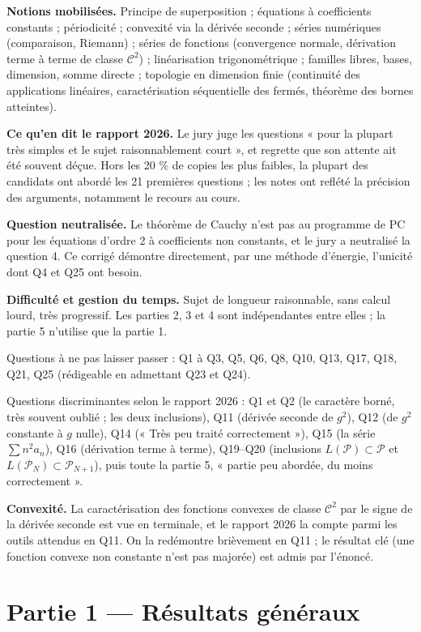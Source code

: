 \documentclass[11pt,a4paper]{article}
\begin{document}
\textbf{Notions mobilisées.} Principe de superposition ; équations à coefficients constants ; périodicité ; convexité via la dérivée seconde ; séries numériques (comparaison, Riemann) ; séries de fonctions (convergence normale, dérivation terme à terme de classe \(\mathcal C^2\)) ; linéarisation trigonométrique ; familles libres, bases, dimension, somme directe ; topologie en dimension finie (continuité des applications linéaires, caractérisation séquentielle des fermés, théorème des bornes atteintes).

\textbf{Ce qu'en dit le rapport 2026.} Le jury juge les questions « pour la plupart très simples et le sujet raisonnablement court », et regrette que son attente ait été souvent déçue. Hors les 20 \% de copies les plus faibles, la plupart des candidats ont abordé les 21 premières questions ; les notes ont reflété la précision des arguments, notamment le recours au cours.

\textbf{Question neutralisée.} Le théorème de Cauchy n'est pas au programme de PC pour les équations d'ordre 2 à coefficients non constants, et le jury a neutralisé la question 4. Ce corrigé démontre directement, par une méthode d'énergie, l'unicité dont Q4 et Q25 ont besoin.

\textbf{Difficulté et gestion du temps.} Sujet de longueur raisonnable, sans calcul lourd, très progressif. Les parties 2, 3 et 4 sont indépendantes entre elles ; la partie 5 n'utilise que la partie 1.

Questions à ne pas laisser passer : Q1 à Q3, Q5, Q6, Q8, Q10, Q13, Q17, Q18, Q21, Q25 (rédigeable en admettant Q23 et Q24).

Questions discriminantes selon le rapport 2026 : Q1 et Q2 (le caractère borné, très souvent oublié ; les deux inclusions), Q11 (dérivée seconde de \(g^2\)), Q12 (de \(g^2\) constante à \(g\) nulle), Q14 (« Très peu traité correctement »), Q15 (la série \(\sum n^2a_n\)), Q16 (dérivation terme à terme), Q19--Q20 (inclusions \(L(\mathcal P)\subset\mathcal P\) et \(L(\mathcal P_N)\subset\mathcal P_{N+1}\)), puis toute la partie 5, « partie peu abordée, du moins correctement ».

\textbf{Convexité.} La caractérisation des fonctions convexes de classe \(\mathcal C^2\) par le signe de la dérivée seconde est vue en terminale, et le rapport 2026 la compte parmi les outils attendus en Q11. On la redémontre brièvement en Q11 ; le résultat clé (une fonction convexe non constante n'est pas majorée) est admis par l'énoncé.

\hypertarget{partie-1-ruxe9sultats-guxe9nuxe9raux}{%
\section{Partie 1 --- Résultats généraux}\label{partie-1-ruxe9sultats-guxe9nuxe9raux}}
\end{document}
